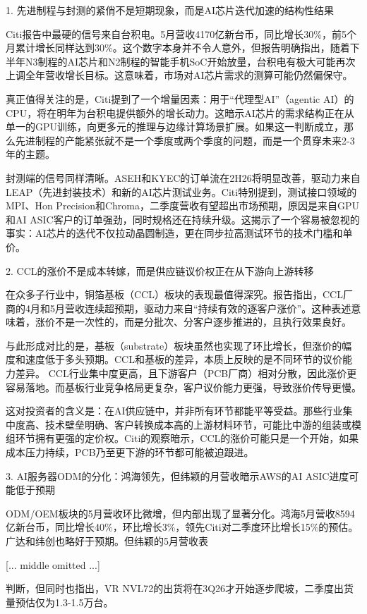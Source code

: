 \documentclass[11pt]{ctexart}
\begin{document}
1. 先进制程与封测的紧俏不是短期现象，而是AI芯片迭代加速的结构性结果

Citi报告中最硬的信号来自台积电。5月营收4170亿新台币，同比增长30\%，前5个月累计增长同样达到30\%。这个数字本身并不令人意外，但报告明确指出，随着下半年N3制程的AI芯片和N2制程的智能手机SoC开始放量，台积电有极大可能再次上调全年营收增长目标。这意味着，市场对AI芯片需求的测算可能仍然偏保守。

真正值得关注的是，Citi提到了一个增量因素：用于“代理型AI”（agentic AI）的CPU，将在明年为台积电提供额外的增长动力。这暗示AI芯片的需求结构正在从单一的GPU训练，向更多元的推理与边缘计算场景扩展。如果这一判断成立，那么先进制程的产能紧张就不是一个季度或两个季度的问题，而是一个贯穿未来2-3年的主题。

封测端的信号同样清晰。ASEH和KYEC的订单流在2H26将明显改善，驱动力来自LEAP（先进封装技术）和新的AI芯片测试业务。Citi特别提到，测试接口领域的MPI、Hon Precision和Chroma，二季度营收有望超出市场预期，原因是来自GPU和AI ASIC客户的订单强劲，同时规格还在持续升级。这揭示了一个容易被忽视的事实：AI芯片的迭代不仅拉动晶圆制造，更在同步拉高测试环节的技术门槛和单价。

2. CCL的涨价不是成本转嫁，而是供应链议价权正在从下游向上游转移

在众多子行业中，铜箔基板（CCL）板块的表现最值得深究。报告指出，CCL厂商的4月和5月营收连续超预期，驱动力来自“持续有效的逐客户涨价”。这种表述意味着，涨价不是一次性的，而是分批次、分客户逐步推进的，且执行效果良好。

与此形成对比的是，基板（substrate）板块虽然也实现了环比增长，但涨价的幅度和速度低于多头预期。CCL和基板的差异，本质上反映的是不同环节的议价能力差异。 CCL行业集中度更高，且下游客户（PCB厂商）相对分散，因此涨价更容易落地。而基板行业竞争格局更复杂，客户议价能力更强，导致涨价传导更慢。

这对投资者的含义是：在AI供应链中，并非所有环节都能平等受益。那些行业集中度高、技术壁垒明确、客户转换成本高的上游材料环节，可能比中游的组装或模组环节拥有更强的定价权。Citi的观察暗示，CCL的涨价可能只是一个开始，如果成本压力持续，PCB乃至更下游的环节都可能被迫跟进。

3. AI服务器ODM的分化：鸿海领先，但纬颖的月营收暗示AWS的AI ASIC进度可能低于预期

ODM/OEM板块的5月营收环比微增，但内部出现了显著分化。鸿海5月营收8594亿新台币，同比增长40\%，环比增长3\%，领先Citi对二季度环比增长15\%的预估。广达和纬创也略好于预期。但纬颖的5月营收表

[... middle omitted ...]

判断，但同时也指出，VR NVL72的出货将在3Q26才开始逐步爬坡，二季度出货量预估仅为1.3-1.5万台。
\end{document}
